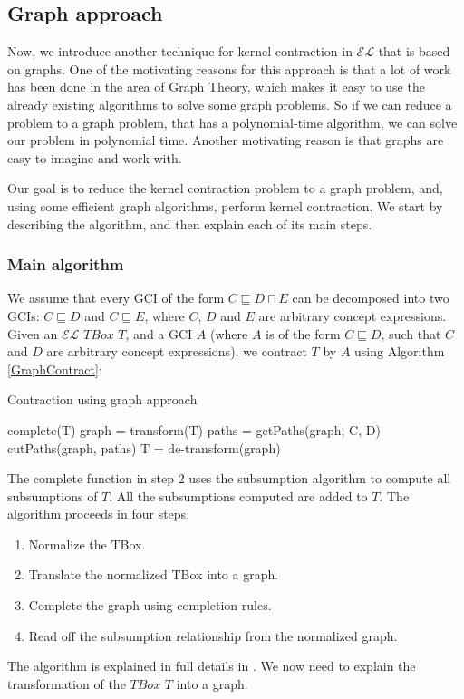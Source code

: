 \subsection{Graph approach}
Now, we introduce another technique for kernel contraction in $\mathcal{EL}$ that is based on graphs. One of the motivating reasons for this approach is that a lot of work has been done in the area of Graph Theory, which makes it easy to use the already existing algorithms to solve some graph problems. So if we can reduce a problem to a graph problem, that has a polynomial-time algorithm, we can solve our problem in polynomial time. Another motivating reason is that graphs are easy to imagine and work with.

Our goal is to reduce the kernel contraction problem to a graph problem, and, using some efficient graph algorithms, perform kernel contraction. We start by describing the algorithm, and then explain each of its main steps.

\subsubsection{Main algorithm}
We assume that every GCI of the form $C \sqsubseteq D \sqcap E$ can be decomposed into two GCIs: $C \sqsubseteq D$ and $C \sqsubseteq E$, where $C$, $D$ and $E$ are arbitrary concept expressions. Given an $\mathcal{EL}$ $TBox$ $T$, and a GCI $A$ (where $A$ is of the form $C \sqsubseteq D$, such that $C$ and $D$ are arbitrary concept expressions), we contract $T$ by $A$ using Algorithm \ref{GraphContract}:

\begin{algorithm}
\caption{Contraction using graph approach}
\label{GraphContract}
\begin{algorithmic}[1]
\State complete(T)
\State graph = transform(T)
\State paths = getPaths(graph, C, D)
\State cutPaths(graph, paths)
\State T = de-transform(graph)
\EndFunction
\end{algorithmic}
\end{algorithm}

The complete function in step 2 uses the subsumption algorithm to compute all subsumptions of $T$. All the subsumptions computed are added to $T$. The algorithm proceeds in four steps:
\begin{enumerate}
\item Normalize the TBox.
\item Translate the normalized TBox into a graph.
\item Complete the graph using completion rules.
\item Read off the subsumption relationship from the normalized graph.\cite{new}
\end{enumerate}
The algorithm is explained in full details in \cite{new}. We now need to explain the transformation of the $TBox$ $T$ into a graph.

